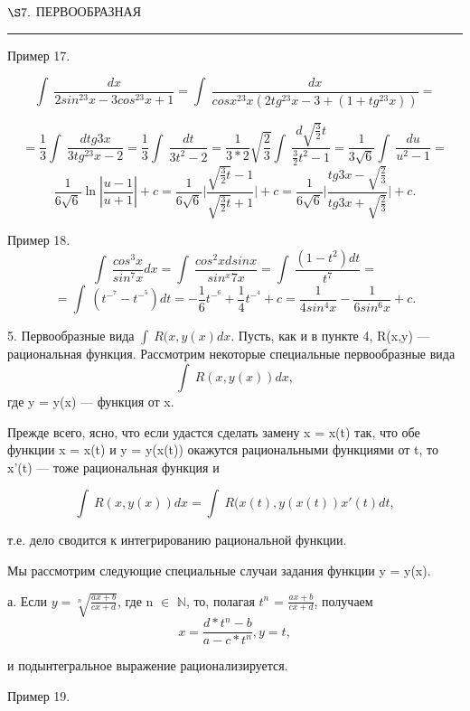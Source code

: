 \documentclass[10pt]{article}
\begin{document}
    \newpage

    \begin{center}
        \begin{spacing}
            $\S7.$ \small{ПЕРВООБРАЗНАЯ}
            \noindent\rule{\textwidth}{1pt}
		\end{spacing}
    \end{center}
    
    \par Пример 17.

    $$\int \ \frac{dx}{2sin^23x - 3cos^23x + 1} = \int \ \frac{dx}{cosx^23x(2tg^23x - 3 + (1 + tg^23x))} =$$

    $$ = \frac{1}{3} \int \ \frac{dtg3x}{3tg^23x - 2} = \frac{1}{3}\int \ \frac{dt}{3t^2 - 2} = \frac{1}{3 * 2}\sqrt{\frac{2}{3}}\int \ \frac{d\sqrt{\frac{3}{2}}t}{\frac{3}{2}t^2 - 1} = \frac{1}{3\sqrt{6}}\int \ \frac{du}{u^2 - 1} = $$
    $$\frac{1}{6\sqrt{6}}\ln{|\frac{u-1}{u+1}| + c} = \frac{1}{6\sqrt{6}}\bigg|\frac{\sqrt{\frac{3}{2}t} - 1}{\sqrt{\frac{3}{2}t} + 1}\bigg| + c = \frac{1}{6\sqrt{6}}\bigg|\frac{tg3x - \sqrt{\frac{2}{3}}}{tg3x + \sqrt{\frac{2}{3}}}\bigg| + c.$$

    \par Пример 18.
    $$\int \ \frac{cos^3x}{sin^7x}dx = \int \ \frac{cos^2x d sinx}{sin^x7x} = \int \ \frac{(1-t^2) dt}{t^7} = $$
    $$ = \int \ (t^-^7 - t^-^5)dt = -\frac{1}{6}t^-^6 + \frac{1}{4}t^-^4 + c = \frac{1}{4sin^4x} - \frac{1}{6sin^6x} + c.$$

    \par 5. Первообразные вида $\int \ R(x, y(x) dx.$ Пусть, как и в пункте 4, R(x,y) — рациональная функция.
    Рассмотрим некоторые специальные первообразные вида
    $$\int \ R(x, y(x)) dx,$$
    где y = y(x) — функция от x.

    \par Прежде всего, ясно, что если удастся сделать замену x = x(t) так, что обе функции x = x(t) и y = y(x(t)) окажутся рациональными функциями от t, то x'(t) — тоже рациональная функция и

    $$\int \ R(x, y(x)) dx = \int \ R(x(t), y(x(t))x'(t) dt,$$
    \par т.е. дело сводится к интегрированию рациональной функции.

    \par Мы рассмотрим следующие специальные случаи задания функции y = y(x).
    \par а. Если $y = \sqrt[n]{\frac{ax + b}{cx + d}}$, где n $\in$  $\mathbb{N}$, то, полагая $t^n$ = $\frac{ax + b}{cx + d}$, получаем
    $$x = \frac{d * t^n - b}{a - c * t^n}, y = t,$$
    \par и подынтегральное выражение рационализируется.
    \par Пример 19.
\end{document}
